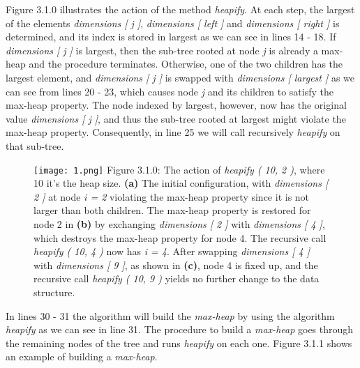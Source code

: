 Figure 3.1.0 illustrates the action of the method {\itshape heapify}. At each step, the largest of the elements {\itshape dimensions [ j ]}, {\itshape dimensions [ left ]} and {\itshape dimensions [ right ]} is determined, and its index is stored in largest as we can see in lines 14 - 18. If {\itshape dimensions [ j ]} is largest, then the sub-tree rooted at node {\itshape j} is already a max-heap and the procedure terminates. Otherwise, one of the two children has the largest element, and {\itshape dimensions [ j ]} is swapped with {\itshape dimensions [ largest ]} as we can see from lines 20 - 23, which causes node {\itshape j} and its children to satisfy the max-heap property. The node indexed by largest, however, now has the original value {\itshape dimensions [ j ]}, and thus the sub-tree rooted at largest might violate the max-heap property. Consequently, in line 25 we will call recursively {\itshape heapify} on that sub-tree.

\begin{figure}[H]
\texttt{[image: 1.png]}
{\centering \linebreak \linebreak \small Figure 3.1.0: The action of {\itshape heapify ( 10, 2 )}, where 10 it's the heap size. {\bfseries (a)} The initial configuration, with {\itshape dimensions [ 2 ]} at node {\itshape i = 2} violating the max-heap property since it is not larger than both children. The max-heap property is restored for node 2 in {\bfseries (b)} by exchanging {\itshape dimensions [ 2 ]} with {\itshape dimensions [ 4 ]}, which destroys the max-heap property for node 4. The recursive call {\itshape heapify ( 10, 4 )} now has {\itshape i = 4}. After swapping {\itshape dimensions [ 4 ]} with {\itshape dimensions [ 9 ]}, as shown in {\bfseries (c)}, node 4 is fixed up, and the recursive call {\itshape heapify ( 10, 9 )} yields no further change to the data structure.}
\end{figure} \hfill

In lines 30 - 31 the algorithm will build the {\itshape max-heap} by using the algorithm {\itshape heapify} as we can see in line 31. The procedure to build a {\itshape max-heap} goes through the remaining nodes of the tree and runs {\itshape heapify} on each one. Figure 3.1.1 shows an example of building a {\itshape max-heap}. \hfill \break

